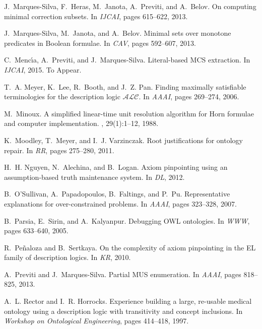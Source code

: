 \documentclass{llncs}
\begin{document}
\begin{thebibliography}{10}
J.~Marques{-}Silva, F.~Heras, M.~Janota, A.~Previti, and A.~Belov.
\newblock On computing minimal correction subsets.
\newblock In {\em IJCAI}, pages 615--622, 2013.

J.~Marques-Silva, M.~Janota, and A.~Belov.
\newblock Minimal sets over monotone predicates in {B}oolean formulae.
\newblock In {\em CAV}, pages 592--607, 2013.

C.~Menc\'{\i}a, A.~Previti, and J.~Marques-Silva.
\newblock Literal-based {MCS} extraction.
\newblock In {\em IJCAI}, 2015.
\newblock To Appear.

T.~A. Meyer, K.~Lee, R.~Booth, and J.~Z. Pan.
\newblock Finding maximally satisfiable terminologies for the description logic
  $\mathcal{ALC}$.
\newblock In {\em AAAI}, pages 269--274, 2006.

M.~Minoux.
 {A} simplified linear-time unit resolution algorithm for
  {H}orn formulae and computer implementation.
, 29(1):1--12, 1988.

K.~Moodley, T.~Meyer, and I.~J. Varzinczak.
\newblock Root justifications for ontology repair.
\newblock In {\em RR}, pages 275--280, 2011.

H.~H. Nguyen, N.~Alechina, and B.~Logan.
\newblock Axiom pinpointing using an assumption-based truth maintenance system.
\newblock In {\em DL}, 2012.

B.~O'Sullivan, A.~Papadopoulos, B.~Faltings, and P.~Pu.
\newblock Representative explanations for over-constrained problems.
\newblock In {\em AAAI}, pages 323--328, 2007.

B.~Parsia, E.~Sirin, and A.~Kalyanpur.
\newblock Debugging {OWL} ontologies.
\newblock In {\em WWW}, pages 633--640, 2005.

R.~Pe{\~{n}}aloza and B.~Sertkaya.
\newblock On the complexity of axiom pinpointing in the {EL} family of
  description logics.
\newblock In {\em KR}, 2010.

A.~Previti and J.~Marques{-}Silva.
\newblock Partial {MUS} enumeration.
\newblock In {\em AAAI}, pages 818--825, 2013.

A.~L. Rector and I.~R. Horrocks.
\newblock Experience building a large, re-usable medical ontology using a
  description logic with transitivity and concept inclusions.
\newblock In {\em Workshop on Ontological Engineering}, pages 414--418, 1997.


\end{thebibliography}
\end{document}
